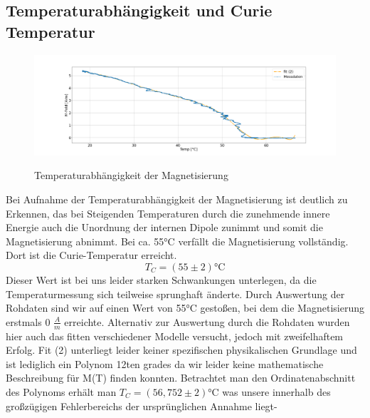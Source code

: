     \subsection{Temperaturabhängigkeit und Curie Temperatur}
        \begin{figure}[H]
            \centering
            \includegraphics[width=\textwidth]{Images/Teil3.png}
            \label{Temp}
            \caption{Temperaturabhängigkeit der Magnetisierung}
        \end{figure}
        Bei Aufnahme der Temperaturabhängigkeit der Magnetisierung ist deutlich zu Erkennen, das bei Steigenden Temperaturen durch die zunehmende innere Energie
        auch die Unordnung der internen Dipole zunimmt und somit die Magnetisierung abnimmt. Bei ca. 55°C verfällt die Magnetisierung vollständig. Dort ist die Curie-Temperatur erreicht.
        $$T_C  = (55 \pm 2)\text{°C}$$
        Dieser Wert ist bei uns leider starken Schwankungen unterlegen, da die Temperaturmessung sich teilweise sprunghaft änderte. Durch Auswertung der Rohdaten sind wir auf einen Wert von 55°C gestoßen, bei dem die Magnetisierung erstmals
        0 $\frac{A}{m}$ erreichte. Alternativ zur Auswertung durch die Rohdaten wurden hier auch das fitten verschiedener Modelle versucht, jedoch mit zweifelhaftem Erfolg.
        Fit (2) unterliegt leider keiner spezifischen physikalischen Grundlage und ist lediglich ein Polynom 12ten grades da wir leider keine mathematische Beschreibung für M(T) finden konnten. Betrachtet man den Ordinatenabschnitt des Polynoms erhält man
        $T_C = (56,752 \pm 2)\text{°C}$ was unsere innerhalb des großzügigen Fehlerbereichs der ursprünglichen Annahme liegt-
